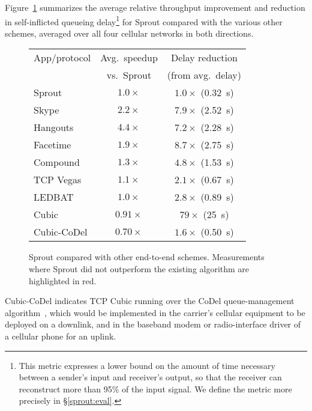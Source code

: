 Figure~\ref{f:sproutcompe2e} summarizes the average relative throughput
improvement and reduction in self-inflicted queueing
delay\footnote{This metric expresses a lower bound on the amount of
  time necessary between a sender's input and receiver's output, so
  that the receiver can reconstruct more than 95\% of the input
  signal. We define the metric more precisely in \S\ref{sprout:eval}.} for
Sprout compared with the various other schemes, averaged over all four
cellular networks in both directions.

\begin{figure}
\caption{Sprout compared with other end-to-end schemes. Measurements where
  Sprout did not outperform the existing algorithm are highlighted in
  red.}
\label{f:sproutcompe2e}

\begin{center}
\noindent \begin{tabular}{|l|c|c|}
\hline
App/protocol & Avg.~speedup & Delay reduction \\
& \footnotesize{vs.~Sprout} & \footnotesize{(from avg.~delay)}\\
\hline
\hline
\cellcolor{blue!20}Sprout & \cellcolor{blue!20}$1.0\times$ & \cellcolor{blue!20}$1.0\times$ (0.32~s) \\
\hline
Skype & $2.2\times$ & $7.9\times$ (2.52~s) \\
Hangouts & $4.4\times$ & $7.2\times$ (2.28~s) \\
Facetime & $1.9\times$ & $8.7\times$ (2.75~s) \\
\hline
Compound & $1.3\times$ & $4.8\times$ (1.53~s) \\
TCP Vegas & $1.1\times$ & $2.1\times$ (0.67~s) \\
LEDBAT & $1.0\times$ & $2.8\times$ (0.89~s) \\
Cubic & \cellcolor{red!20}$0.91\times$ & $79\times$ (25~s)\\
\hline
Cubic-CoDel & \cellcolor{red!20}$0.70\times$ & $1.6\times$ (0.50~s) \\
\hline
\end{tabular}
\end{center}

\end{figure}

Cubic-CoDel indicates TCP Cubic running over the CoDel
queue-management algorithm~\cite{CoDel}, which would be implemented in the
carrier's cellular equipment to be deployed on a downlink, and in
the baseband modem or radio-interface driver of a cellular phone for an
uplink.

